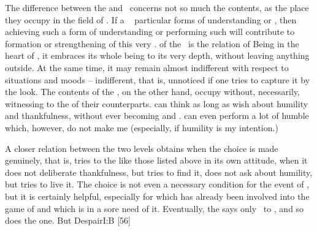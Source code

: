 \pa\label{pa:sameSame}
The difference between the  and  \Yes\ concerns 
not so much the contents, as the 
place they occupy in the field of .
If a \nexus\  particular forms of understanding or , then
achieving such a form of understanding or performing such  will contribute
to formation or strengthening of this very \nexus. 
 of the
 \yes\ is the relation of Being in the heart of , it
embraces its whole being to its very depth, without leaving anything outside. At
the same time, it may remain almost indifferent with respect to 
situations and moods -- indifferent, that is, unnoticed if one tries to capture
it by the  look. The contents of the  \yes, on the
other hand, occupy  without, necessarily, witnessing to the
 of their  counterparts.  can think as long as
 wish about humility and thankfulness, without ever becoming 
and .  can even perform a lot of humble  which,
however, do not make me  (especially, if humility is my intention.)

A closer relation between the two levels obtains when the
 choice is made genuinely, that is,   tries to 
 the  like those listed above in its own attitude, when it does
not deliberate thankfulness, but tries to find it, does not ask about
humility, but tries to live it.  The  choice is not even a necessary
condition for the  event of \yes, but it is certainly helpful,
especially for  which has already been involved into the game of
 and which is in a sore need of  it.
Eventually, the  says only \yes\ to , and
so does the  one. But \citet{[i]t requires an eminent reflection,
or rather a great faith, to sustain a reflection on nothing, which is to say
infinite reflection.}{Despair}{I:B [56]}


